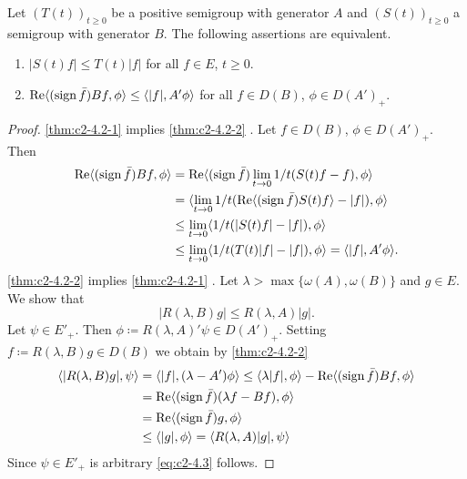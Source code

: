 \begin{theorem}\label{thm:c2-4.2}
Let $(T(t))_{t \geq 0}$ be a positive semigroup with generator $A$ and $(S(t))_{t \geq 0}$ a semigroup with generator $B$. The following assertions are equivalent.
\begin{enumerate}[\upshape (a)]
\item \label{thm:c2-4.2-1}
$|S(t)f| \leq T(t)|f|$ for all $f \in E$, $t \geq 0$.
\item \label{thm:c2-4.2-2}
$\mathop{}\!\mathrm{Re}\langle(\operatorname{sign}  \bar{f}) Bf,\phi\rangle \leq \langle|f|,A'\phi\rangle$ for all $f \in D(B)$, $\phi \in D(A')_{+}$.
\end{enumerate}
\end{theorem}
\begin{proof}
\ref{thm:c2-4.2-1}   implies \ref{thm:c2-4.2-2}  . Let $f \in D(B)$, $\phi \in D(A')_{+}$. Then
\begin{align*}
\mathop{}\!\mathrm{Re}\langle(\operatorname{sign}  \bar{f})Bf, \phi\rangle &= \mathop{}\!\mathrm{Re}  \langle(\operatorname{sign}  \bar{f})\lim_{t \to 0}1/t(S(t)f - f),\phi\rangle\\
&= \langle\lim_{t \to 0}1/t(\mathop{}\!\mathrm{Re}\langle(\operatorname{sign}  \bar{f}) S(t)f\rangle - |f|),\phi\rangle\\
&\leq \lim_{t \to 0}\langle 1/t(|S(t)f| - |f|),\phi\rangle\\
&\leq \lim_{t \to 0}\langle 1/t(T(t)|f| - |f|),\phi\rangle = \langle|f|,A'\phi\rangle.
\end{align*}
\ref{thm:c2-4.2-2}   implies \ref{thm:c2-4.2-1}  . 
Let $\lambda > \max\{\omega (A),\omega (B)\}$ and $g \in E$. 
We show that
\begin{equation}\label{eq:c2-4.3}
|R(\lambda,B)g| \leq R(\lambda,A)|g|.
\end{equation}
Let $\psi \in E'_{+}$. Then $\phi \coloneq R(\lambda,A)'\psi \in D(A')_{+}$.
Setting $f \coloneq R(\lambda,B)g \in D(B)$ we obtain by \ref{thm:c2-4.2-2}  
\begin{align*}
\langle|R(\lambda,B)g|,\psi\rangle &= \langle|f|,(\lambda-A')\phi\rangle \leq \langle\lambda|f|,\phi\rangle - \mathop{}\!\mathrm{Re}\langle(\operatorname{sign}  \bar{f})Bf,\phi\rangle\\
&= \mathop{}\!\mathrm{Re}\langle(\operatorname{sign}  \bar{f})(\lambda f - Bf),\phi\rangle \\
&= \mathop{}\!\mathrm{Re}\langle(\operatorname{sign}  \bar{f})g,\phi\rangle \\
&\leq \langle|g|,\phi\rangle = \langle R(\lambda,A)|g|,\psi\rangle
\end{align*}
Since $\psi \in E'_{+}$ is arbitrary \eqref{eq:c2-4.3} follows.
\end{proof}

